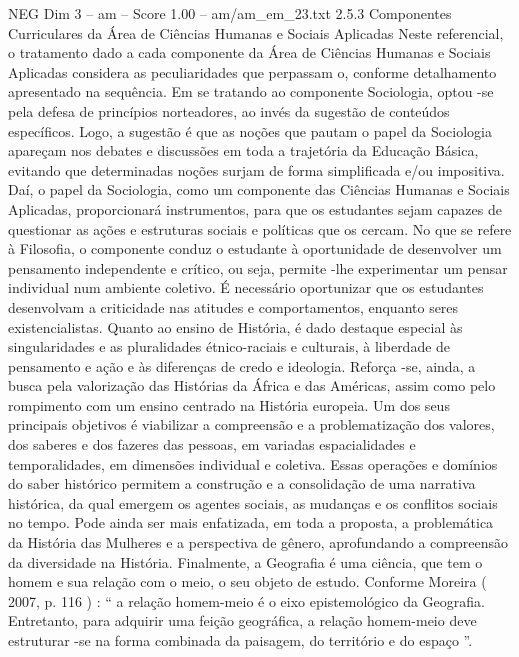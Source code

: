 \begin{textsample}{NEG Dim 3 – am – Score 1.00 – am/am\_em\_23.txt}  \label{ex:f3_neg_257}
2.5.3 Componentes Curriculares da Área de Ciências Humanas e Sociais Aplicadas Neste referencial, o tratamento dado a cada componente da Área de Ciências Humanas e Sociais Aplicadas considera as peculiaridades que perpassam o, conforme detalhamento apresentado na sequência.
Em se tratando ao componente Sociologia, optou -se pela defesa de princípios norteadores, ao invés da sugestão de conteúdos específicos.
Logo, a sugestão é que as noções que pautam o papel da Sociologia apareçam nos debates e discussões em toda a trajetória da Educação Básica, evitando que determinadas noções surjam de forma simplificada e/ou impositiva.
Daí, o papel da Sociologia, como um componente das Ciências Humanas e Sociais Aplicadas, proporcionará instrumentos, para que os estudantes sejam capazes de questionar as ações e estruturas sociais e políticas que os cercam.
No que se refere à Filosofia, o componente conduz o estudante à oportunidade de desenvolver um pensamento independente e crítico, ou seja, permite -lhe experimentar um pensar individual num ambiente coletivo.
É necessário oportunizar que os estudantes desenvolvam a criticidade nas atitudes e comportamentos, enquanto seres existencialistas.
Quanto ao ensino de História, é dado destaque especial às singularidades e as pluralidades étnico-raciais e culturais, à liberdade de pensamento e ação e às diferenças de credo e ideologia.
Reforça -se, ainda, a busca pela valorização das Histórias da África e das Américas, assim como pelo rompimento com um ensino centrado na História europeia.
Um dos seus principais objetivos é viabilizar a compreensão e a problematização dos valores, dos saberes e dos fazeres das pessoas, em variadas espacialidades e temporalidades, em dimensões individual e coletiva.
Essas operações e domínios do saber histórico permitem a construção e a consolidação de uma narrativa histórica, da qual emergem os agentes sociais, as mudanças e os conflitos sociais no tempo.
Pode ainda ser mais enfatizada, em toda a proposta, a problemática da História das Mulheres e a perspectiva de gênero, aprofundando a compreensão da diversidade na História.
Finalmente, a Geografia é uma ciência, que tem o homem e sua relação com o meio, o seu objeto de estudo.
Conforme Moreira ( 2007, p. 116 ) : “ a relação homem-meio é o eixo epistemológico da Geografia.
Entretanto, para adquirir uma feição geográfica, a relação homem-meio deve estruturar -se na forma combinada da paisagem, do território e do espaço ”.

\end{textsample}
